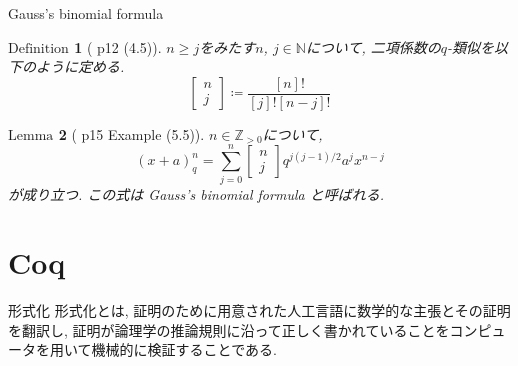 \documentclass[dvipdfmx,cjk]{beamer}
\theoremstyle{mystyle}
\newtheorem{df}{$\textrm{Definition}$}[section]
\newtheorem{lem}[df]{$\textrm{Lemma}$}
\newcommand{\bpf}{\begin{proof}}
\newcommand{\epf}{\end{proof}}
\newcommand{\N}{\mathbb{N}}
\newcommand{\Z}{\mathbb{Z}}
\newcommand{\qcoe}[2]{\left[\begin{array}{ccc}#1\\#2\end{array}\right]}
\newcommand{\0}{\textbf{0}}
\begin{document}
\begin{frame}{Gauss's binomial formula}
	\begin{df}[\cite{Kac} p12 (4.5)]
		$n \ge j$をみたす$n$, $j \in \N$について, 二項係数の$q$-類似を以下のように定める. 
		\[
			\qcoe{n}{j} \coloneqq \frac{[n]!}{[j]![n - j]!}
		\]
	\end{df}
   \begin{lem}[\cite{Kac} p15 Example (5.5)]
	  $n \in \Z_{>0}$について, 
	  \[
	    (x + a)^n_q = \sum_{j = 0}^n \qcoe{n}{j} q^{j (j - 1)/2} a^j x^{n - j}
	  \]
	  が成り立つ. この式は Gauss's binomial formula と呼ばれる. 
	\end{lem}
\end{frame}
\section{Coq}

\begin{frame}
  \tableofcontents[currentsection] 
\end{frame}

\begin{frame}{形式化}
  形式化とは, 証明のために用意された人工言語に数学的な主張とその証明を翻訳し, 証明が論理学の推論規則に沿って正しく書かれていることをコンピュータを用いて機械的に検証することである.
\end{frame}
\end{document}
